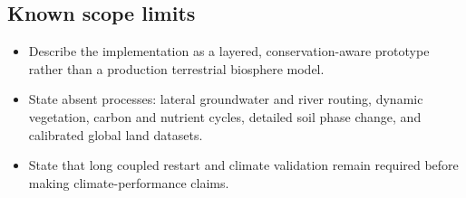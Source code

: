 \subsection{Known scope limits}
\begin{itemize}
  \item Describe the implementation as a layered, conservation-aware prototype rather than a production terrestrial biosphere model.
  \item State absent processes: lateral groundwater and river routing, dynamic vegetation, carbon and nutrient cycles, detailed soil phase change, and calibrated global land datasets.
  \item State that long coupled restart and climate validation remain required before making climate-performance claims.
\end{itemize}

